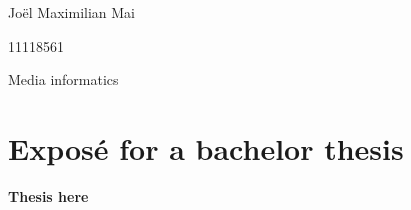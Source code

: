 \begin{titlepage}
Joël Maximilian Mai 
\vspace{0.1cm}

11118561 
\vspace{0.1cm}

Media informatics 
\vspace{2cm}

\section*{Exposé for a bachelor thesis}
\vspace{0.4cm}

\begin{LARGE}
\textbf{Thesis here} 	
\end{LARGE}

\vspace{2cm}
\tableofcontents

\end{titlepage}
